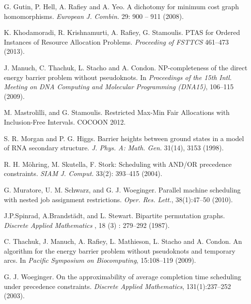 \documentclass[letterpaper,11pt,abstracton]{scrartcl}
\begin{document}
{\begin{thebibliography}{999}
 G. Gutin, P. Hell, A. Rafiey and A. Yeo.
	A dichotomy for minimum cost graph homomorphisms.
	\emph{European J. Combin.} 29: 900 -- 911 (2008).



 K. Khodamoradi, R. Krishnamurti, A. Rafiey, G. Stamoulis.
PTAS for Ordered Instances of Resource Allocation Problems. \emph{Proceeding of   FSTTCS}  461--473 (2013).



J. Manuch, C. Thachuk, L. Stacho and A. Condon.
NP-completeness of the direct energy barrier problem without pseudoknots.
In \emph{Proceedings of the 15th Intl. Meeting on DNA Computing and
Molecular Programming (DNA15)}, 106--115 (2009).


M. Mastrolilli, and G. Stamoulis.
Restricted Max-Min Fair Allocations with Inclusion-Free
               Intervals.  COCOON 2012.


S. R. Morgan and P. G. Higgs.
Barrier heights between ground states in a model of RNA secondary structure.
\emph{J. Phys. A: Math. Gen.} 31(14), 3153 (1998).


 R. H. M\"ohring, M. Skutella, F. Stork:
Scheduling with AND/OR precedence constraints. \emph{SIAM J. Comput.} 33(2): 393--415 (2004).


 G. Muratore, U. M. Schwarz, and G. J. Woeginger. Parallel machine scheduling with nested
job assignment restrictions. \emph{Oper. Res. Lett.}, 38(1):47--50 (2010).


 J.P.Spinrad, A.Brandst{\"{a}}dt, and L. Stewart.
Bipartite permutation graphs. \emph{Discrete Applied Mathematics }, 18 (3) : 279--292 (1987).


C. Thachuk, J. Manuch, A. Rafiey, L. Mathieson, L. Stacho and A. Condon.
An algorithm for the energy barrier problem without pseudoknots and
temporary arcs.
In {\em Pacific Symposium on Biocomputing}, 15:108--119 (2009).


 G. J. Woeginger. On the approximability of average completion time
scheduling under precedence constraints. \emph{Discrete Applied Mathematics},
131(1):237--252 (2003).

\end{thebibliography}
}
\end{document}
